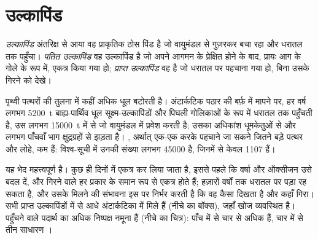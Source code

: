 \section{उल्कापिंड}

\begin{definition}[उल्कापिंड, पतित उल्कापिंड, प्राप्त उल्कापिंड]
\label{def:b2:planet-formation-meteorites:fall-find}
\emph{उल्कापिंड} अंतरिक्ष से आया वह प्राकृतिक ठोस पिंड है जो
वायुमंडल से गुज़रकर बचा रहा और धरातल तक पहुँचा।
\emph{पतित उल्कापिंड} वह उल्कापिंड है जो अपने
आगमन के प्रेक्षित होने के बाद, प्रायः आग के गोले के रूप में, एकत्र किया गया हो; \emph{प्राप्त
उल्कापिंड} वह है जो धरातल पर पहचाना गया हो, बिना उसके गिरने
को देखे।
\end{definition}

पृथ्वी पत्थरों की तुलना में कहीं अधिक धूल बटोरती है। अंटार्कटिक पठार की बर्फ़ में
मापने पर, हर वर्ष लगभग \qty{5200}{t} बाह्य-पार्थिव धूल सूक्ष्म-उल्कापिंडों और पिघली
गोलिकाओं के रूप में धरातल तक पहुँचती है, उस लगभग
\qty{15000}{t} में से जो वायुमंडल में प्रवेश करती है; उसका अधिकांश धूमकेतुओं से और लगभग
पाँचवाँ भाग क्षुद्रग्रहों से झड़ता है। , अर्थात् एक-एक करके पहचाने जा सकने जितने बड़े
पत्थर और लोहे, कम हैं: विश्व-सूची में उनकी संख्या लगभग
\num{45000} है, जिनमें से केवल \num{1107}  हैं।

यह भेद महत्त्वपूर्ण है।  कुछ ही दिनों में एकत्र कर लिया जाता है, इससे पहले कि वर्षा और
ऑक्सीजन उसे बदल दें, और गिरने वाले हर प्रकार के  समान रूप से एकत्र
होते हैं;  हज़ारों वर्षों तक धरातल पर पड़ा रह सकता है, और उसके
मिलने की संभावना इस पर निर्भर करती है कि वह कैसा दिखता है और कहाँ गिरा। सभी
प्राप्त उल्कापिंडों में से आधे अंटार्कटिका में मिले हैं (नीचे का बॉक्स), जहाँ खोज
व्यवस्थित है।  पहुँचने वाले पदार्थ का अधिक निष्पक्ष नमूना हैं (नीचे का चित्र):
पाँच में से चार से अधिक  हैं, चार में से तीन साधारण ।

